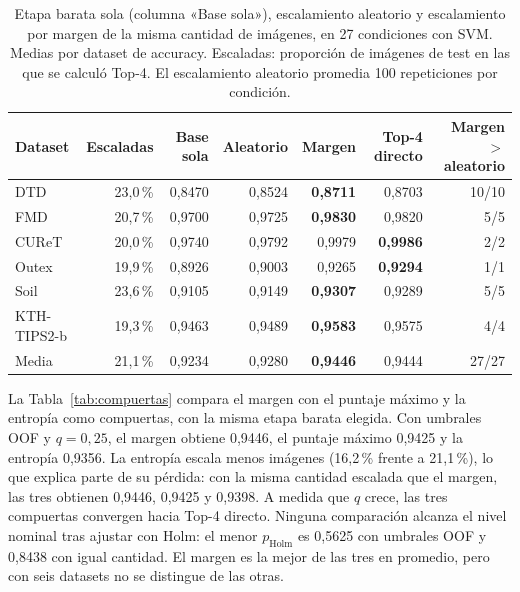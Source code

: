 \documentclass[a4paper,fleqn]{cas-sc}
\begin{document}
\begin{table}[pos=htbp]
\centering
\caption{Etapa barata sola (columna «Base sola»), escalamiento aleatorio y escalamiento por margen de la misma cantidad de imágenes, en 27 condiciones con SVM. Medias por dataset de accuracy. Escaladas: proporción de imágenes de test en las que se calculó Top-4. El escalamiento aleatorio promedia 100 repeticiones por condición.}
\label{tab:control-aleatorio}
\small
\begin{tabular}{@{}lrrrrrr@{}}
\toprule
Dataset & Escaladas & Base sola & Aleatorio & Margen & Top-4 directo & Margen $>$ aleatorio \\
\midrule
DTD & 23,0\,\% & 0,8470 & 0,8524 & \textbf{0,8711} & 0,8703 & 10/10 \\
FMD & 20,7\,\% & 0,9700 & 0,9725 & \textbf{0,9830} & 0,9820 & 5/5 \\
CUReT & 20,0\,\% & 0,9740 & 0,9792 & 0,9979 & \textbf{0,9986} & 2/2 \\
Outex & 19,9\,\% & 0,8926 & 0,9003 & 0,9265 & \textbf{0,9294} & 1/1 \\
Soil & 23,6\,\% & 0,9105 & 0,9149 & \textbf{0,9307} & 0,9289 & 5/5 \\
KTH-TIPS2-b & 19,3\,\% & 0,9463 & 0,9489 & \textbf{0,9583} & 0,9575 & 4/4 \\
\midrule
Media & 21,1\,\% & 0,9234 & 0,9280 & \textbf{0,9446} & 0,9444 & 27/27 \\
\bottomrule
\end{tabular}
\end{table}

La Tabla~\ref{tab:compuertas} compara el margen con el puntaje máximo y la entropía como compuertas, con la misma etapa barata elegida. Con umbrales OOF y $q=0{,}25$, el margen obtiene 0,9446, el puntaje máximo 0,9425 y la entropía 0,9356. La entropía escala menos imágenes (16,2\,\% frente a 21,1\,\%), lo que explica parte de su pérdida: con la misma cantidad escalada que el margen, las tres obtienen 0,9446, 0,9425 y 0,9398. A medida que $q$ crece, las tres compuertas convergen hacia Top-4 directo. Ninguna comparación alcanza el nivel nominal tras ajustar con Holm: el menor $p_{\mathrm{Holm}}$ es 0,5625 con umbrales OOF y 0,8438 con igual cantidad. El margen es la mejor de las tres en promedio, pero con seis datasets no se distingue de las otras.
\end{document}
